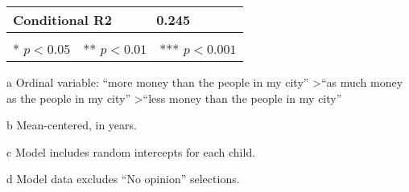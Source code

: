 \begin{table*}[t]
\begin{threeparttable}
\begin{tabular}{llcr}
 \textbf{Conditional R2} & 0.245 &  &  \\ 
\bottomrule\\[-.75em]
\multicolumn{4}{r}{* $p<0.05$~~** $p<0.01$~~*** $p<0.001$}\\
\end{tabular}
\begin{tablenotes}[flushleft]
    \item[a] Ordinal variable: ``more money than the people in my city'' \textgreater ``as much money as the people in my city'' \textgreater ``less money than the people in my city''
    \item[b] Mean-centered, in years.
    \item[c] Model includes random intercepts for each child.
    \item[d] Model data excludes ``No opinion'' selections. 
\end{tablenotes}
\end{threeparttable}
\end{table*}